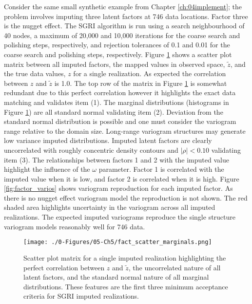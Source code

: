 Consider the same small synthetic example from Chapter \ref{ch:04implement}; the problem involves imputing three latent factors at 746 data locations. Factor three is the nugget effect. The \gls{SGRI} algorithm is run using a search neighbourhood of 40 nodes, a maximum of 20,000 and 10,000 iterations for the coarse search and polishing steps, respectively, and rejection tolerances of 0.1 and 0.01 for the coarse search and polishing steps, respectively. Figure \ref{fig:fact_scatter_marginals} shows a scatter plot matrix between all imputed factors, the mapped values in observed space, $\tilde{z}$, and the true data values, $z$ for a single realization. As expected the correlation between $z$ and $\tilde{z}$ is 1.0. The top row of the matrix in Figure \ref{fig:fact_scatter_marginals} is somewhat redundant due to this perfect correlation however it highlights the exact data matching and validates item (1). The marginal distributions (histograms in Figure \ref{fig:fact_scatter_marginals}) are all standard normal validating item (2). Deviation from the standard normal distribution is possible and one must consider the variogram range relative to the domain size. Long-range variogram structures may generate low variance imputed distributions. Imputed latent factors are clearly uncorrelated with roughly concentric density contours and $\lvert \rho \rvert < 0.10$ validating item (3). The relationships between factors 1 and 2 with the imputed value highlight the influence of the $\omega$ parameter. Factor 1 is correlated with the imputed value when it is low, and factor 2 is correlated when it is high. Figure \ref{fig:factor_varios} shows variogram reproduction for each imputed factor. As there is no nugget effect variogram model the reproduction is not shown. The red shaded area highlights uncertainty in the variogram across all imputed realizations. The expected imputed variograms reproduce the single structure variogram models reasonably well for 746 data.

\begin{figure}[htb!]
    \centering
    \texttt{[image: ./0-Figures/05-Ch5/fact\_scatter\_marginals.png]}
    \caption{Scatter plot matrix for a single imputed realization highlighting the perfect correlation between $z$ and $\tilde{z}$, the uncorrelated nature of all latent factors, and the standard normal nature of all marginal distributions. These features are the first three minimum acceptance criteria for \gls{SGRI} imputed realizations.}
    \label{fig:fact_scatter_marginals}
\end{figure}

